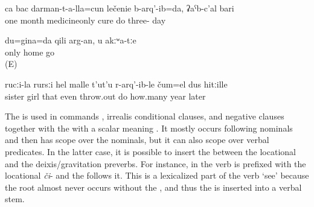 \begin{exe}
	\ex	\label{ex:‎‎‎For one month I was cured only with pills, for 30 days minor}
	\gll	ca	bac	darman-t-a-lla=cun	lečenie	b-arq'-ib=da,	ʡaˁb-c'al	bari\\
		one	month	medicineonly	cure	do	three-	day\\
	\glt	{}

	\ex	\label{ex:Only I / I alone will go home, not you minor@6}
	\gll	du=gina=da	qili	arg-an,	u	akːʷa-tːe\\
		only	home	go		\\
	\glt	{} (E)

	\ex	\label{ex:‎‎‎Even his sisters daughter did he throw out, after some years minor}
	\gll	rucːi-la	rursːi	hel	malle	t'ut'u	r-arq'-ib-le	čum=el	dus	hitːille\\
		sister	girl	that	even	throw.out	do	how.many	year	later\\
	\glt	{}
\end{exe}

The    is used in commands , irrealis conditional clauses, and negative clauses together with the    with a scalar  meaning . It mostly occurs following nominals and then has scope over the nominals, but it can also scope over verbal predicates. In the latter case, it is possible to insert the  between the locational and the deixis/gravitation preverbs. For instance, in  the verb is prefixed with the locational  \textit{či}- and the  follows it. This  is a lexicalized part of the verb `see' because the root almost never occurs without the , and thus the  is inserted into a verbal stem.

